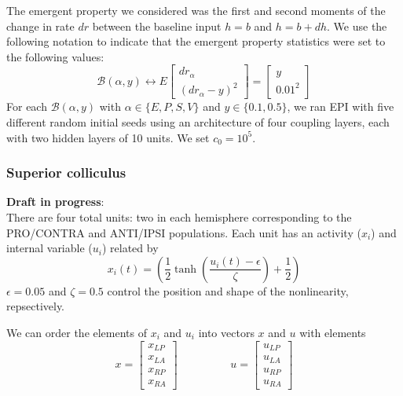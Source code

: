 \documentclass[11pt]{article}
\begin{document}
The emergent property we considered was the first and second moments of the change in rate $dr$ between the baseline input $h= b$ and $h = b + dh$.  We use the following notation to indicate that the emergent property statistics were set to the following values:
\begin{equation}
\mathcal{B}(\alpha, y) \leftrightarrow 
E \begin{bmatrix} dr_\alpha \\ (dr_\alpha - y)^2 \end{bmatrix} = \begin{bmatrix} y \\ 0.01^2 \end{bmatrix}
\end{equation}
For each $\mathcal{B}(\alpha, y)$ with $\alpha \in \{E, P, S, V\}$ and $y \in \{0.1, 0.5\}$, we ran EPI with five different random initial seeds using an architecture of four coupling layers, each with two hidden layers of 10 units.  We set $c_0 = 10^5$.

\subsubsection{Superior colliculus}\label{methods_SC}
\textbf{Draft in progress}: \\
There are four total units: two in each hemisphere corresponding to the PRO/CONTRA and ANTI/IPSI populations.  Each unit has an activity ($x_i$) and internal variable ($u_i$) related by
\begin{equation}
x_i(t) =\left(\frac{1}{2}\tanh\left(\frac{u_i(t) - \epsilon}{\zeta}\right)+ \frac{1}{2} \right)
\end{equation}
$\epsilon = 0.05$ and $\zeta = 0.5$ control the position and shape of the nonlinearity, repsectively.

We can order the elements of $x_i$ and $u_i$ into vectors $x$ and $u$ with elements
\begin{equation}
x = \begin{bmatrix} x_{LP} \\ x_{LA} \\ x_{RP} \\ x_{RA} \end{bmatrix} \hspace{2cm} u = \begin{bmatrix} u_{LP} \\ u_{LA} \\ u_{RP} \\ u_{RA} \end{bmatrix}
\end{equation}
\end{document}
